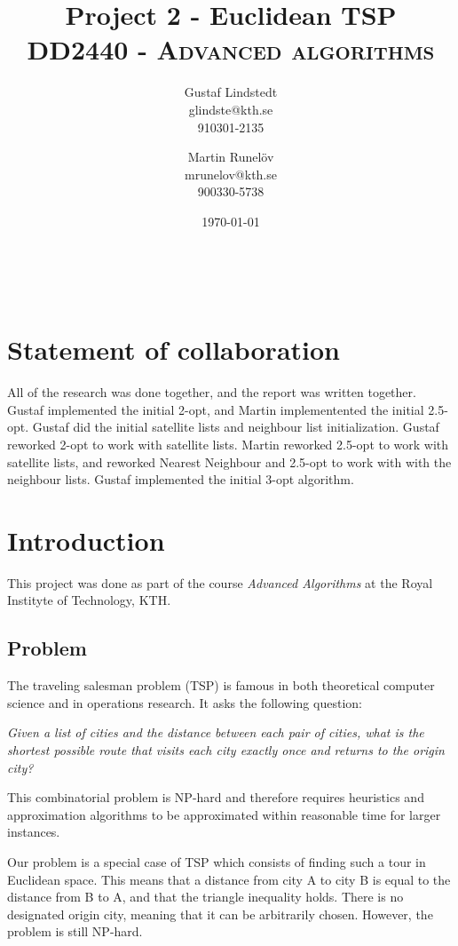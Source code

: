 \documentclass[paper=a4, fontsize=11pt,numbers=endperiod]{scrartcl} %
\title{ 
\huge Project 2 - Euclidean TSP \\ %
\vspace{10pt}
\normalfont \normalsize 
\textsc{DD2440 - Advanced algorithms } \\ [25pt] %
}
\author{Gustaf Lindstedt \\ glindste@kth.se \\ 910301-2135 \and Martin Runelöv \\ mrunelov@kth.se \\ 900330-5738}
\date{\vspace{8pt}\normalsize\today} %
\numberwithin{equation}{section} %
\numberwithin{figure}{section} %
\numberwithin{table}{section} %
\begin{document}
\maketitle %


\hspace{0pt}\\
\section*{Statement of collaboration}
All of the research was done together, and the report was written together.
Gustaf implemented the initial 2-opt, and Martin implementented the initial 2.5-opt.
Gustaf did the initial satellite lists and neighbour list initialization. Gustaf reworked 2-opt to work with satellite lists.
Martin reworked 2.5-opt to work with satellite lists, and reworked Nearest Neighbour and 2.5-opt to work with with the neighbour lists.
Gustaf implemented the initial 3-opt algorithm.

\section{Introduction}

This project was done as part of the course \emph{Advanced Algorithms} at the Royal Instityte of Technology, KTH.

\subsection{Problem}

The traveling salesman problem (TSP) is famous in both theoretical computer science and in operations research. It asks the following question: 

\begin{center}
    \emph{Given a list of cities and the distance between each pair of cities, what is the shortest possible route that visits each city exactly once and returns to the origin city?}
\end{center}

This combinatorial problem is NP-hard and therefore requires heuristics and approximation algorithms to be approximated within reasonable time for larger instances.

Our problem is a special case of TSP which consists of finding such a tour in Euclidean space. This means that a distance from city A to city B is equal to the distance from B to A, and that the triangle inequality holds. There is no designated origin city, meaning that it can be arbitrarily chosen.
However, the problem is still NP-hard.
\end{document}
